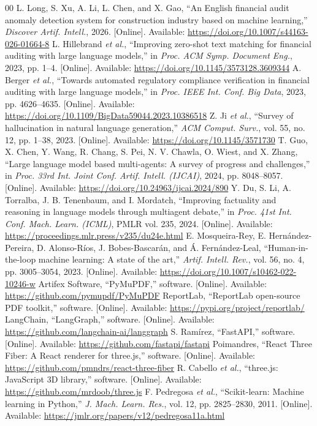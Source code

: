\documentclass[conference]{IEEEtran}
\begin{document}
\begin{thebibliography}{00}
 L. Long, S. Xu, A. Li, L. Chen, and X. Gao, ``An English financial audit anomaly detection system for construction industry based on machine learning,'' \textit{Discover Artif. Intell.}, 2026. [Online]. Available: \url{https://doi.org/10.1007/s44163-026-01664-8}
 L. Hillebrand \textit{et al.}, ``Improving zero-shot text matching for financial auditing with large language models,'' in \textit{Proc. ACM Symp. Document Eng.}, 2023, pp. 1--4. [Online]. Available: \url{https://doi.org/10.1145/3573128.3609344}
 A. Berger \textit{et al.}, ``Towards automated regulatory compliance verification in financial auditing with large language models,'' in \textit{Proc. IEEE Int. Conf. Big Data}, 2023, pp. 4626--4635. [Online]. Available: \url{https://doi.org/10.1109/BigData59044.2023.10386518}
 Z. Ji \textit{et al.}, ``Survey of hallucination in natural language generation,'' \textit{ACM Comput. Surv.}, vol. 55, no. 12, pp. 1--38, 2023. [Online]. Available: \url{https://doi.org/10.1145/3571730}
 T. Guo, X. Chen, Y. Wang, R. Chang, S. Pei, N. V. Chawla, O. Wiest, and X. Zhang, ``Large language model based multi-agents: A survey of progress and challenges,'' in \textit{Proc. 33rd Int. Joint Conf. Artif. Intell. (IJCAI)}, 2024, pp. 8048--8057. [Online]. Available: \url{https://doi.org/10.24963/ijcai.2024/890}
 Y. Du, S. Li, A. Torralba, J. B. Tenenbaum, and I. Mordatch, ``Improving factuality and reasoning in language models through multiagent debate,'' in \textit{Proc. 41st Int. Conf. Mach. Learn. (ICML)}, PMLR vol. 235, 2024. [Online]. Available: \url{https://proceedings.mlr.press/v235/du24e.html}
 E. Mosqueira-Rey, E. Hern\'{a}ndez-Pereira, D. Alonso-R\'{i}os, J. Bobes-Bascar\'{a}n, and \'{A}. Fern\'{a}ndez-Leal, ``Human-in-the-loop machine learning: A state of the art,'' \textit{Artif. Intell. Rev.}, vol. 56, no. 4, pp. 3005--3054, 2023. [Online]. Available: \url{https://doi.org/10.1007/s10462-022-10246-w}
 Artifex Software, ``PyMuPDF,'' software. [Online]. Available: \url{https://github.com/pymupdf/PyMuPDF}
 ReportLab, ``ReportLab open-source PDF toolkit,'' software. [Online]. Available: \url{https://pypi.org/project/reportlab/}
 LangChain, ``LangGraph,'' software. [Online]. Available: \url{https://github.com/langchain-ai/langgraph}
 S. Ram\'{i}rez, ``FastAPI,'' software. [Online]. Available: \url{https://github.com/fastapi/fastapi}
 Poimandres, ``React Three Fiber: A React renderer for three.js,'' software. [Online]. Available: \url{https://github.com/pmndrs/react-three-fiber}
 R. Cabello \textit{et al.}, ``three.js: JavaScript 3D library,'' software. [Online]. Available: \url{https://github.com/mrdoob/three.js}
 F. Pedregosa \textit{et al.}, ``Scikit-learn: Machine learning in Python,'' \textit{J. Mach. Learn. Res.}, vol. 12, pp. 2825--2830, 2011. [Online]. Available: \url{https://jmlr.org/papers/v12/pedregosa11a.html}
\end{thebibliography}
\end{document}
